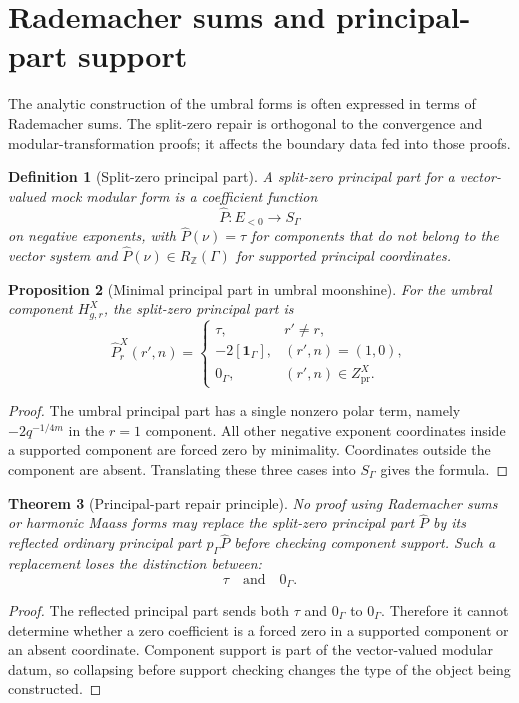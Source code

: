 \documentclass[11pt]{article}
\newtheorem{theorem}{Theorem}[section]
\newtheorem{proposition}[theorem]{Proposition}
\newtheorem{definition}[theorem]{Definition}
\newcommand{\ZZ}{\mathbb Z}
\newcommand{\one}{\mathbf 1}
\begin{document}
\section{Rademacher sums and principal-part support}

The analytic construction of the umbral forms is often expressed in terms of Rademacher sums.  The split-zero repair is orthogonal to the convergence and modular-transformation proofs; it affects the boundary data fed into those proofs.

\begin{definition}[Split-zero principal part]
A split-zero principal part for a vector-valued mock modular form is a coefficient function
\[
\widehat P:E_{<0}\to S_\Gamma
\]
on negative exponents, with \(\widehat P(\nu)=\tau\) for components that do not belong to the vector system and \(\widehat P(\nu)\in R_\ZZ(\Gamma)\) for supported principal coordinates.
\end{definition}

\begin{proposition}[Minimal principal part in umbral moonshine]
For the umbral component \(H^X_{g,r}\), the split-zero principal part is
\[
\widehat P^X_{r}(r',n)=
\begin{cases}
\tau,&r'\ne r,\\
-2[\one_\Gamma],&(r',n)=(1,0),\\
0_\Gamma,&(r',n)\in Z^X_{\mathrm{pr}}.
\end{cases}
\]
\end{proposition}

\begin{proof}
The umbral principal part has a single nonzero polar term, namely \(-2q^{-1/4m}\) in the \(r=1\) component.  All other negative exponent coordinates inside a supported component are forced zero by minimality.  Coordinates outside the component are absent.  Translating these three cases into \(S_\Gamma\) gives the formula.
\end{proof}

\begin{theorem}[Principal-part repair principle]
No proof using Rademacher sums or harmonic Maass forms may replace the split-zero principal part \(\widehat P\) by its reflected ordinary principal part \(p_\Gamma\widehat P\) before checking component support.  Such a replacement loses the distinction between:
\[
\tau
\quad\text{and}\quad
0_\Gamma.
\]
\end{theorem}

\begin{proof}
The reflected principal part sends both \(\tau\) and \(0_\Gamma\) to \(0_\Gamma\).  Therefore it cannot determine whether a zero coefficient is a forced zero in a supported component or an absent coordinate.  Component support is part of the vector-valued modular datum, so collapsing before support checking changes the type of the object being constructed.
\end{proof}
\end{document}
